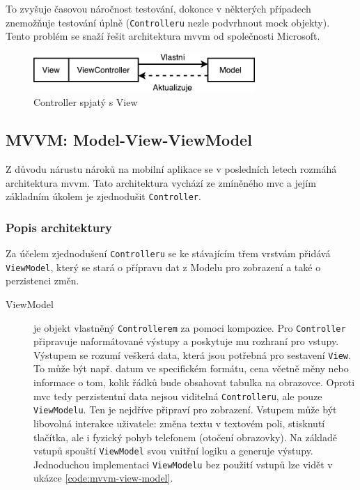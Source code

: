 To zvyšuje časovou náročnost testování, dokonce v některých případech znemožňuje testování úplně (\texttt{Controlleru} nezle podvrhnout mock objekty).
Tento problém se snaží řešit architektura \acrfull{mvvm} od společnosti Microsoft.

\begin{figure}\centering
	\includegraphics[width=0.75\textwidth]{assets/analysis-massive-view-controller.pdf}
	\caption[Role Controlleru v MVC]{Controller spjatý s View}\label{fig:massive-mvc}
\end{figure}

\subsection{MVVM: Model-View-ViewModel}\label{analyza-mvvm}

Z důvodu nárustu nároků na mobilní aplikace se v posledních letech rozmáhá architektura \acrshort{mvvm}.
Tato architektura vychází ze zmíněného \acrshort{mvc} a jejím základním úkolem je zjednodušit \texttt{Controller}.

\subsubsection*{Popis architektury} \label{architektura-mvvm-popis}

Za účelem zjednodušení \texttt{Controlleru} se ke stávajícím třem vrstvám přidává \texttt{ViewModel}, který se stará o přípravu dat z Modelu pro zobrazení a také o perzistenci změn.

\begin{description}
  \item[ViewModel] je objekt vlastněný \texttt{Controllerem} za pomoci kompozice.
  Pro \texttt{Controller} připravuje naformátované výstupy a poskytuje mu rozhraní pro vstupy.
  Výstupem se rozumí veškerá data, která jsou potřebná pro sestavení \texttt{View}.
  To může být např. datum ve specifickém formátu, cena včetně měny nebo informace o tom, kolik řádků bude obsahovat tabulka na obrazovce.
  Oproti \acrshort{mvc} tedy perzistentní data nejsou viditelná \texttt{Controlleru}, ale pouze \texttt{ViewModelu}.
  Ten je nejdříve připraví pro zobrazení.
  Vstupem může být libovolná interakce uživatele:
  změna textu v textovém poli, stisknutí tlačítka, ale i fyzický pohyb telefonem (otočení obrazovky).
  Na základě vstupů spouští \texttt{ViewModel} svou vnitřní logiku a generuje výstupy.
  Jednoduchou implementaci \texttt{ViewModelu} bez použití vstupů lze vidět v ukázce \ref{code:mvvm-view-model}.
\end{description}

